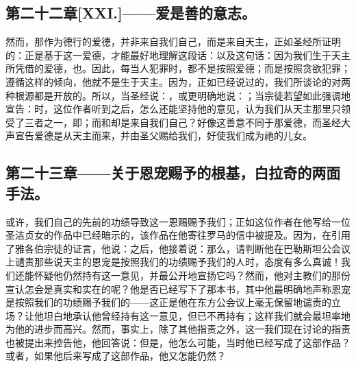 
\subsection{第二十二章[XXI.]——爱是善的意志。}

然而，那作为德行的爱德，并非来自我们自己，而是来自天主，正如圣经所证明的：正是基于这一爱德，才能最好地理解这段话：以及这句话：因为我们生于天主所凭借的爱德，也。因此，每当人犯罪时，都不是按照爱德；而是按照贪欲犯罪；遵循这样的倾向，他就不是生于天主。因为，正如已经说过的，我们所谈论的对两种根源都是开放的。所以，当圣经说：，或更明确地说：；当宗徒若望如此强调地宣告：时，这位作者听到之后，怎么还能坚持他的意见，认为我们从天主那里只领受了三者之一，即；而和却是来自我们自己？好像这善意不同于那爱德，而圣经大声宣告爱德是从天主而来，并由圣父赐给我们，好使我们成为祂的儿女。\par


\subsection{第二十三章——关于恩宠赐予的根基，白拉奇的两面手法。}

或许，我们自己的先前的功绩导致这一恩赐赐予我们；正如这位作者在他写给一位圣洁贞女的作品中已经暗示的，该作品在他寄往罗马的信中被提及。因为，在引用了雅各伯宗徒的证言，他说：之后，他接着说：那么，请判断他在巴勒斯坦公会议上谴责那些说天主的恩宠是按照我们的功绩赐予我们的人时，态度有多么真诚！我们还能怀疑他仍然持有这一意见，并最公开地宣扬它吗？然而，他对主教们的那份宣认怎会是真实和实在的呢？他是否已经写下了那本书，其中他最明确地声称恩宠是按照我们的功绩赐予我们的——这正是他在东方公会议上毫无保留地谴责的立场？让他坦白地承认他曾经持有这一意见，但已不再持有；这样我们就会最坦率地为他的进步而高兴。然而，事实上，除了其他指责之外，这一我们现在讨论的指责也被提出来控告他，他回答说：但是，他怎么可能，当时他已经写成了这部作品？或者，如果他后来写成了这部作品，他又怎能仍然？\par

